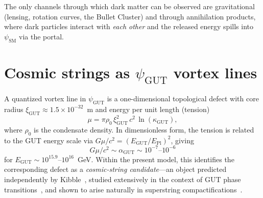 \documentclass[11pt]{article}
\begin{document}
The only channels through which dark matter can be observed are gravitational (lensing, rotation curves, the Bullet Cluster) and through annihilation products, where dark particles interact with \emph{each other} and the released energy spills into $\psi_\text{SM}$ via the portal.

\section{Cosmic strings as $\psi_\text{GUT}$ vortex lines}
\label{sec:cosmic-strings}

A quantized vortex line in $\psi_\text{GUT}$ is a one-dimensional topological defect with core radius $\xi_\text{GUT} \approx 1.5 \times 10^{-32}$~m and energy per unit length (tension)
\begin{equation}
\mu = \pi\rho_0\,\xi_\text{GUT}^2\,c^2\,\ln(\kappa_\text{GUT}),
\label{eq:string-tension}
\end{equation}
where $\rho_0$ is the condensate density.
In dimensionless form, the tension is related to the GUT energy scale via $G\mu/c^2 = (E_\text{GUT}/E_\text{Pl})^2$, giving
\begin{equation}
G\mu/c^2 \sim \alpha_\text{GUT} \sim 10^{-7}\text{--}10^{-6}
\end{equation}
for $E_\text{GUT} \sim 10^{15.9}\text{--}10^{16}$~GeV.
Within the present model, this identifies the corresponding defect as a \emph{cosmic-string candidate}---an object predicted independently by Kibble~\cite{Kibble1976}, studied extensively in the context of GUT phase transitions~\cite{Vilenkin1985}, and shown to arise naturally in superstring compactifications~\cite{Witten1985,Polchinski2005}.
\end{document}
